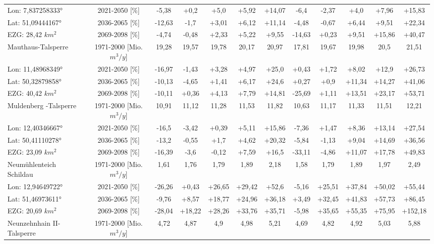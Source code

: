 \begin{longtable}{@{\extracolsep{\fill}}lc|ccccc||ccccc}
\cline{2-12} 
Lon: 7,837258333° & 2021-2050 [\%]  & -5,38 & +0,2 & +5,0 & +5,92 & +14,07 & -6,4 & -2,37 & +4,0 & +7,96 & +15,83\\ 
Lat: 51,09444167° & 2036-2065 [\%]  & -12,63 & -1,7 & +3,01 & +6,12 & +11,14 & -4,48 & -0,67 & +6,44 & +9,51 & +22,34\\ 
EZG: 28,42 $km^2$ & 2069-2098 [\%]  & -4,74 & -0,48 & +2,33 & +5,22 & +9,55 & -14,63 & +0,23 & +9,51 & +15,86 & +40,47\\ 
\hline 
Mauthaus-Talsperre & 1971-2000 [Mio. $m^3/y$]  & 19,28 & 19,57 & 19,78 & 20,17 & 20,97 & 17,81 & 19,67 & 19,98 & 20,5 & 21,51\\ 
\cline{2-12} 
Lon: 11,48968349° & 2021-2050 [\%]  & -16,97 & -1,43 & +3,28 & +4,97 & +25,0 & +0,43 & +1,72 & +8,02 & +12,9 & +26,73\\ 
Lat: 50,32879858° & 2036-2065 [\%]  & -10,13 & -4,65 & +1,41 & +6,17 & +24,6 & +0,27 & +0,9 & +11,34 & +14,27 & +41,06\\ 
EZG: 40,42 $km^2$ & 2069-2098 [\%]  & -10,11 & +0,36 & +4,13 & +7,79 & +14,81 & -25,69 & +1,11 & +13,51 & +23,17 & +53,71\\ 
\hline 
Muldenberg -Talsperre & 1971-2000 [Mio. $m^3/y$]  & 10,91 & 11,12 & 11,28 & 11,53 & 11,82 & 10,63 & 11,17 & 11,33 & 11,51 & 12,21\\ 
\cline{2-12} 
Lon: 12,40346667° & 2021-2050 [\%]  & -16,5 & -3,42 & +0,39 & +5,11 & +15,86 & -7,36 & +1,47 & +8,36 & +13,14 & +27,54\\ 
Lat: 50,41110278° & 2036-2065 [\%]  & -13,2 & -0,55 & +1,7 & +4,62 & +20,32 & -5,84 & -1,13 & +9,04 & +14,69 & +36,56\\ 
EZG: 23,09 $km^2$ & 2069-2098 [\%]  & -16,39 & -3,6 & -0,12 & +7,59 & +16,5 & -33,11 & -4,86 & +11,07 & +17,78 & +49,83\\ 
\hline 
Neumühlenteich Schildau & 1971-2000 [Mio. $m^3/y$]  & 1,61 & 1,76 & 1,79 & 1,89 & 2,18 & 1,58 & 1,79 & 1,89 & 1,97 & 2,49\\ 
\cline{2-12} 
Lon: 12,94649722° & 2021-2050 [\%]  & -26,26 & +0,43 & +26,65 & +29,42 & +52,6 & -5,16 & +25,51 & +37,84 & +50,02 & +55,44\\ 
Lat: 51,46973611° & 2036-2065 [\%]  & -9,76 & +8,57 & +18,77 & +24,96 & +36,18 & +3,49 & +32,45 & +41,83 & +57,73 & +86,45\\ 
EZG: 20,69 $km^2$ & 2069-2098 [\%]  & -28,04 & +18,22 & +28,26 & +33,76 & +35,71 & -5,98 & +35,65 & +55,35 & +75,95 & +152,18\\ 
\hline 
Neunzehnhain II-Talsperre & 1971-2000 [Mio. $m^3/y$]  & 4,72 & 4,87 & 4,9 & 4,98 & 5,21 & 4,69 & 4,82 & 4,92 & 5,03 & 5,88\\ 

\end{longtable}

